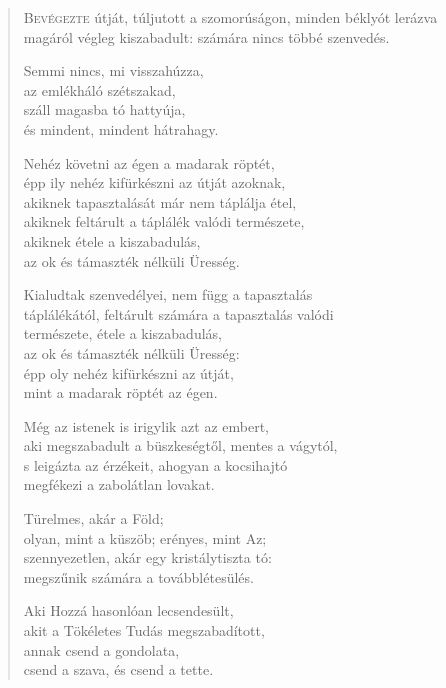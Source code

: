 
\begin{verse}

{\par%
\lettrine{B}{evégezte} {\LettrineTextFont útját, túljutott a szomorúságon,}\newline
minden béklyót lerázva magáról\newline
végleg kiszabadult:\verselinebreak
számára nincs többé szenvedés.
\par}

 Semmi nincs, mi visszahúzza,\\
az emlékháló szétszakad,\\
száll magasba tó hattyúja,\\
és mindent, mindent hátrahagy.

 Nehéz követni az égen a madarak röptét,\\
épp ily nehéz kifürkészni az útját azoknak,\\
akiknek tapasztalását már nem táplálja étel,\\
akiknek feltárult a táplálék valódi természete,\\
akiknek étele a kiszabadulás,\\
az ok és támaszték nélküli Üresség.

 Kialudtak szenvedélyei, nem függ a tapasztalás\\
táplálékától, feltárult számára a tapasztalás valódi\\
természete, étele a kiszabadulás,\\
az ok és támaszték nélküli Üresség:\\
épp oly nehéz kifürkészni az útját,\\
mint a madarak röptét az égen.

 Még az istenek is irigylik azt az embert,\\
aki megszabadult a büszkeségtől, mentes a vágytól,\\
s leigázta az érzékeit, ahogyan a kocsihajtó\\
megfékezi a zabolátlan lovakat.

 Türelmes, akár a Föld;\\
olyan, mint a küszöb; erényes, mint Az;\\
szennyezetlen, akár egy kristálytiszta tó:\\
megszűnik számára a továbblétesülés.

 Aki Hozzá hasonlóan lecsendesült,\\
akit a Tökéletes Tudás megszabadított,\\
annak csend a gondolata,\\
csend a szava, és csend a tette.


\end{verse}
